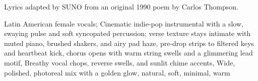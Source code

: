 

\begin{notes}
Lyrics adapted by SUNO from an original 1990 poem by Carlos Thompson.
\end{notes}
\begin{style}
Latin American female vocals; Cinematic indie-pop instrumental with a slow, swaying pulse and soft syncopated percussion; verse texture stays intimate with muted piano, brushed shakers, and airy pad haze, pre-drop strips to filtered keys and heartbeat kick, chorus opens with warm string swells and a glimmering lead motif, Breathy vocal chops, reverse swells, and sunlit chime accents, Wide, polished, photoreal mix with a golden glow, natural, soft, minimal, warm
\end{style}
